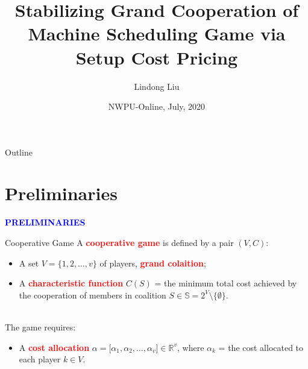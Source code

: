 \documentclass[14pt]{beamer}
\title[Stabilization via Pricing]
{%
	\large
Stabilizing Grand Cooperation of Machine Scheduling Game via Setup Cost Pricing %
}
\author[Lindong Liu] %
{   %
  Lindong Liu
}
\date
{NWPU-Online, July, 2020}
\institute[] %
{\footnotesize
	School of Management; International Institute of Finance\\
	\vspace{2mm}
	University of Science and Technology of China\\
    \vspace{10mm}
	Co-authored with Zikang Li (USTC)
	\vspace{6mm}
}
\newcommand{\R}{\mathbb{R}}
\begin{document}
\begin{frame}
  \titlepage
\end{frame}


\begin{frame}{Outline}
\small
\tableofcontents
\end{frame}

\section{Preliminaries}
\begin{frame}
\centering
\large
\textcolor{blue}{\bf {\huge P}RELIMINARIES}
\end{frame}
\begin{frame}{Cooperative Game}
A \textcolor{red}{\bf cooperative game} is defined by a pair $(V,C)$:
\begin{itemize}
\justifying
	\item A set $V = \big\{1,2,\ldots,v\big\}$ of players, \textcolor{red}{\bf grand colaition};
	\item A \textcolor{red}{\bf characteristic function} $C(S)$ = the minimum total cost achieved by the cooperation of members in coalition $S \in \mathbb{S}=2^V \setminus \{\emptyset\}$.
\end{itemize}

~\\The game requires:
\begin{itemize}
\justifying
	\item A \textcolor{red}{\bf cost allocation} $\alpha=\big[\alpha_1,\alpha_2,\ldots,\alpha_v \big] \in \R^v$, where $\alpha_k$ = the cost allocated to each player $k\in V$.
\end{itemize}
\end{frame}
\end{document}
